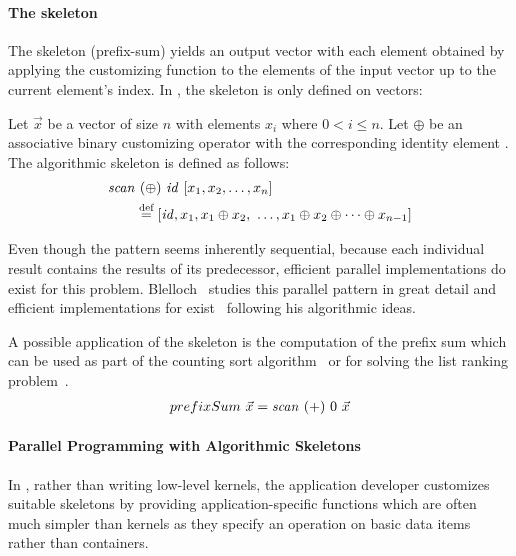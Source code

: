 \paragraph{The \scan skeleton}
The \scan skeleton (\aka prefix-sum) yields an output vector with each element obtained by applying the customizing function to the elements of the input vector up to the current element's index.
In \SkelCL, the \scan skeleton is only defined on vectors:
\begin{definition}
  \label{definition:scan}
  Let $\vec{x}$ be a vector of size $n$ with elements $x_i$ where $0 < i \leq n$.
  Let $\oplus$ be an associative binary customizing operator with the corresponding identity element \id.
  The algorithmic skeleton \scan is defined as follows:
  \begin{equation*}
    \begin{split}
      \text{\textit{scan}}&\ (\oplus)\ \text{\textit{id}}\ [x_1, x_2, \dots, x_n] \\
      &\stackrel{\textrm{\scriptsize def}}{=} [\text{\textit{id}}, x_1, x_1 \oplus x_2,\ \dots,x_1 \oplus x_2 \oplus \cdots \oplus x_{n-1}]
    \end{split}
  \end{equation*}
\end{definition}
\noindent
Even though the \scan pattern seems inherently sequential, because each individual result contains the results of its predecessor, efficient parallel implementations do exist for this problem.
Blelloch~\cite{Blelloch1991} studies this parallel pattern in great detail and efficient implementations for \GPUs exist~\cite{HarrisSeOw2007} following his algorithmic ideas.

A possible application of the \scan skeleton is the computation of the prefix sum which can be used as part of the counting sort algorithm~\cite{Knuth1998} or for solving the list ranking problem~\cite{ColeVi1989}.
\begin{align*}
  prefixSum\ \vec{x} = \text{\textit{scan}}\ (+)\ 0\ \vec{x}
\end{align*}

\paragraph{Parallel Programming with Algorithmic Skeletons}
In \SkelCL, rather than writing low-level kernels, the application developer customizes suitable skeletons by providing application-specific functions which are often much simpler than kernels as they specify an operation on basic data items rather than containers.


